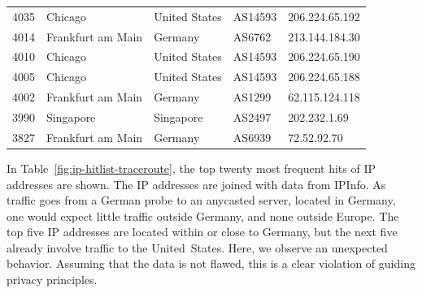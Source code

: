 \begin{table}
\begin{tabular}{rllll}
		4035  & Chicago           & United States & AS14593      & 206.224.65.192  \\
		4014  & Frankfurt am Main & Germany       & AS6762       & 213.144.184.30  \\
		4010  & Chicago           & United States & AS14593      & 206.224.65.190  \\
		4005  & Chicago           & United States & AS14593      & 206.224.65.188  \\
		4002  & Frankfurt am Main & Germany       & AS1299       & 62.115.124.118  \\
		3990  & Singapore         & Singapore     & AS2497       & 202.232.1.69    \\
		3827  & Frankfurt am Main & Germany       & AS6939       & 72.52.92.70     \\
		\bottomrule
	\end{tabular}
\end{table}

In Table~\ref{fig:ip-hitlist-traceroute}, the top twenty most frequent hits of IP addresses are shown. The IP addresses are joined with data from IPInfo. As traffic goes from a German probe to an anycasted server, located in Germany, one would expect little traffic outside Germany, and none outside Europe. The top five IP addresses are located within or close to Germany, but the next five already involve traffic to the United~States. Here, we observe an unexpected behavior. Assuming that the data is not flawed, this is a clear violation of guiding privacy principles.

